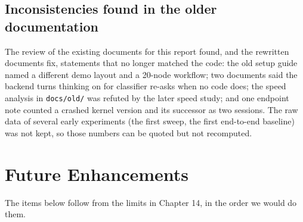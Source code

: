 \subsection{Inconsistencies found in the older documentation}

The review of the existing documents for this report found, and the rewritten documents fix, statements that no longer matched the code: the old setup guide named a different demo layout and a 20-node workflow; two documents said the backend turns thinking on for classifier re-asks when no code does; the speed analysis in \texttt{docs/\allowbreak{}old/\allowbreak{}} was refuted by the later speed study; and one endpoint note counted a crashed kernel version and its successor as two sessions. The raw data of several early experiments (the first sweep, the first end-to-end baseline) was not kept, so those numbers can be quoted but not recomputed.

\section{Future Enhancements}

The items below follow from the limits in Chapter 14, in the order we would do them.

